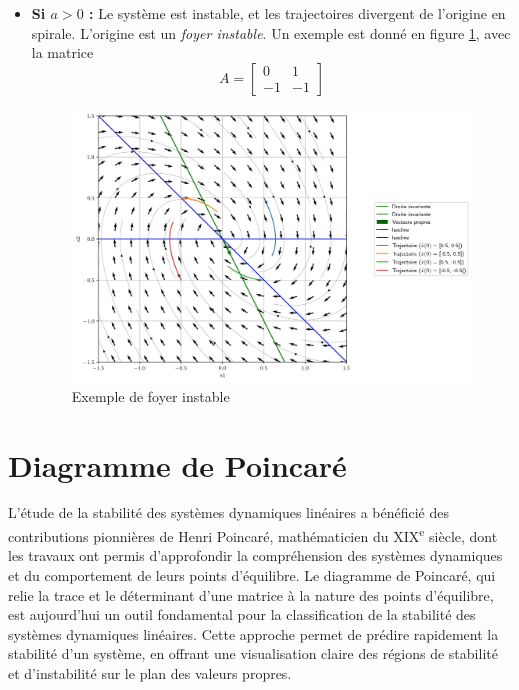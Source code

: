 \begin{itemize}
                \item \textbf{Si $a > 0$ :} Le système est instable, et les trajectoires divergent de l'origine en spirale. L'origine est un \textit{foyer instable}. Un exemple est donné en figure \ref{fig:foyer_instable}, avec la matrice
                \begin{equation}
                    A = \begin{bmatrix} 0 & 1 \\ -1 & -1 \end{bmatrix}
                \end{equation}
                \begin{figure}[ht!]
                    \centering
                    \includegraphics[width=\textwidth]{images/foyer_instable.jpg}
                    \caption{Exemple de foyer instable}
                    \label{fig:foyer_instable}
                \end{figure}
            \end{itemize}
            
    \section{Diagramme de Poincaré}\label{sec:poincare}
        L'étude de la stabilité des systèmes dynamiques linéaires a bénéficié des contributions pionnières de Henri Poincaré, mathématicien du XIX\textsuperscript{e} siècle, dont les travaux ont permis d'approfondir la compréhension des systèmes dynamiques et du comportement de leurs points d'équilibre. Le diagramme de Poincaré, qui relie la trace et le déterminant d'une matrice à la nature des points d'équilibre, est aujourd'hui un outil fondamental pour la classification de la stabilité des systèmes dynamiques linéaires. Cette approche permet de prédire rapidement la stabilité d'un système, en offrant une visualisation claire des régions de stabilité et d'instabilité sur le plan des valeurs propres.
        
